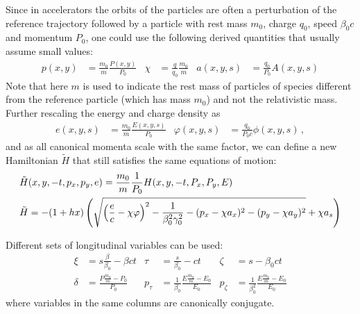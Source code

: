 Since in accelerators the orbits of the 
particles are often a perturbation of the reference trajectory followed by a
particle with rest mass $m_0$, charge $q_0$, speed $\beta_0 c$ and momentum
$P_0$, one could use the following derived quantities that usually assume small
values:
\begin{align}
p(x,y) &=
  \frac{m_0}{m}\frac{P(x,y)}{P_0}   &
\chi &=
  \frac{q}{q_0}\frac{m_0}{m} &
a(x,y,s) &=
  \frac{q_0}{P_0}  A(x,y,s)
\end{align}
Note that here $m$ is used to indicate the rest mass of particles of species
different from the reference particle (which has mass $m_0$) and not the relativistic mass.
Further rescaling the energy and charge density as
\begin{align}
  e(x,y,s) &=
  \frac{m_0}{m}\frac{E(x,y,s)}{P_0}   &
  \varphi(x,y,s) &=
  \frac{q_0}{P_0c}\phi(x,y,s) \,,
\end{align}
and as all canonical momenta scale with the same factor, we can define a new Hamiltonian
$\tilde{H}$ that still satisfies the same equations of motion:
\begin{align}\notag
  &\tilde{H}(x,y,-t, p_x, p_y, e) =
      \frac{m_0}{m}\frac{1}{P_0}H(x,y,-t, P_x, P_y, E) \\
  &\tilde{H}=
    - (1+h x) \left(
      \sqrt{ 
          \left(\frac{e}{c} - \chi\varphi\right)^2
            - \frac{1}{\beta_0^2\gamma_0^2}
           - (p_x - \chi a_x)^2
           - (p_y - \chi a_y)^2}
       + \chi a_s
    \right)
\end{align}

Different sets of longitudinal variables can be used:
\begin{align}
\xi &= s \frac{\beta}{\beta_0} - \beta c t &
\tau &= \frac{s}{\beta_0} - ct &
\zeta &= s - \beta_0 ct \label{eq:coord1}\\
\delta &=
  \frac{P \frac{m_0}{m} -P_0}{P_0} &
p_\tau &=
  \frac{1}{\beta_0} \frac{E \frac{m_0}{m} -E_0}{E_0} &
p_\zeta &=
  \frac{1}{\beta_0^2}\frac{E \frac{m_0}{m} -E_0}{E_0}
  \label{eq:coord2}
\end{align}
where variables in the same columns are canonically conjugate.

